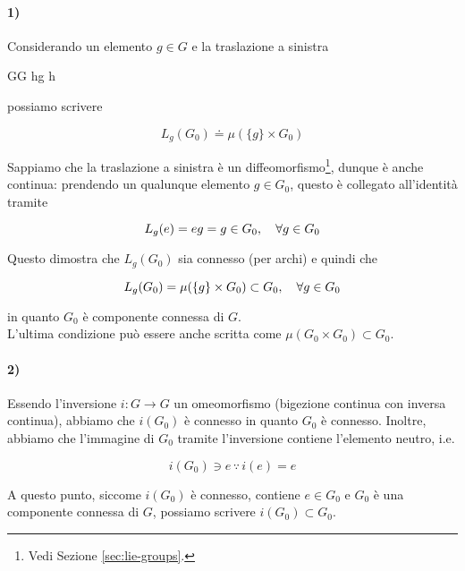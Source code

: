 {
\paragraph{1)}

Considerando un elemento $ g \in G $ e la traslazione a sinistra

	{G}{G}
	{h}{g h}

possiamo scrivere

\begin{equation}
	L_{g}(G_{0}) \doteq \mu(\{g\} \times G_{0})
\end{equation}

Sappiamo che la traslazione a sinistra è un diffeomorfismo\footnote{%
	Vedi Sezione \ref{sec:lie-groups}.%
}, dunque è anche continua: prendendo un qualunque elemento $ g \in G_{0} $, questo è collegato all'identità tramite

\begin{equation}
	L_{g}(e) = e g = g \in G_{0} \qcomma \forall g \in G_{0}
\end{equation}

Questo dimostra che $ L_{g}(G_{0}) $ sia connesso (per archi) e quindi che

\begin{equation}
	L_{g}(G_{0}) = \mu(\{g\} \times G_{0}) \subset G_{0} \qcomma \forall g \in G_{0}
\end{equation}

in quanto $ G_{0} $ è componente connessa di $ G $. \\
L'ultima condizione può essere anche scritta come $ \mu(G_{0} \times G_{0}) \subset G_{0} $.

\paragraph{2)}

Essendo l'inversione $ i : G \to G $ un omeomorfismo (bigezione continua con inversa continua), abbiamo che $ i(G_{0}) $ è connesso in quanto $ G_{0} $ è connesso. Inoltre, abbiamo che l'immagine di $ G_{0} $ tramite l'inversione contiene l'elemento neutro, i.e.

\begin{equation}
	i(G_{0}) \ni e \, \because \, i(e) = e
\end{equation}

A questo punto, siccome $ i(G_{0}) $ è connesso, contiene $ e \in G_{0} $ e $ G_{0} $ è una componente connessa di $ G $, possiamo scrivere $ i(G_{0}) \subset G_{0} $.

}
